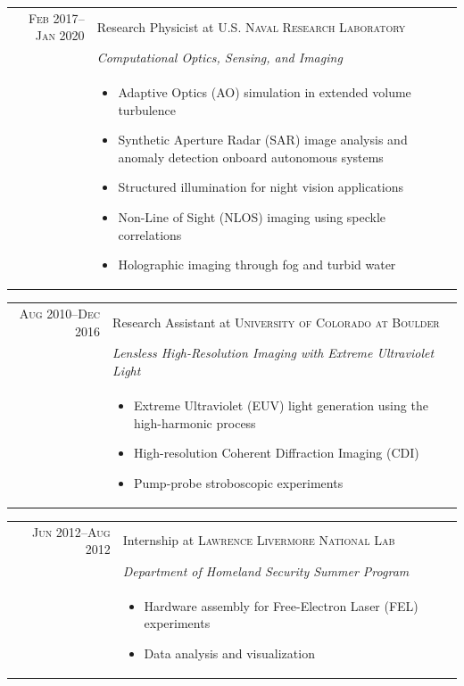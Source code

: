 \documentclass[letterpaper,12pt]{article}
\begin{document}
\begin{tabular}{rp{13cm}}
\textsc{Feb 2017}--\textsc{Jan 2020} & Research Physicist at \textsc{U.S. Naval Research Laboratory}  \\  
& \emph{Computational Optics, Sensing, and Imaging} \\   
& \footnotesize{ 
\begin{itemize}[topsep=0pt,itemsep=0pt,partopsep=0pt,parsep=0pt]
	\vspace{-0.2cm}
	\item Adaptive Optics (AO) simulation in extended volume turbulence
	\item Synthetic Aperture Radar (SAR) image analysis and anomaly detection onboard autonomous systems
	\item Structured illumination for night vision applications
	\item Non-Line of Sight (NLOS) imaging using speckle correlations
	\item Holographic imaging through fog and turbid water
\end{itemize}}\\
\end{tabular}

\begin{tabular}{rp{13cm}}
\textsc{Aug 2010}--\textsc{Dec 2016} & Research Assistant at \textsc{University of Colorado at Boulder}\\
& \emph{Lensless High-Resolution Imaging with Extreme Ultraviolet Light}\\ 
& \footnotesize{
	\begin{itemize}[topsep=0pt,itemsep=0pt,partopsep=0pt,parsep=0pt]
		\vspace{-0.2cm}
		\item Extreme Ultraviolet (EUV) light generation using the high-harmonic process
		\item High-resolution Coherent Diffraction Imaging (CDI)
		\item Pump-probe stroboscopic experiments 

\end{itemize}}\\
\end{tabular}

\begin{tabular}{rp{13cm}}
    \textsc{Jun 2012}--\textsc{Aug 2012} & Internship at \textsc{Lawrence Livermore National Lab}  \\  
    & \emph{Department of Homeland Security Summer Program} \\   
    & \footnotesize{ 
        \begin{itemize}[topsep=0pt,itemsep=0pt,partopsep=0pt,parsep=0pt]
            \vspace{-0.2cm}
            \item Hardware assembly for Free-Electron Laser (FEL) experiments
            \item Data analysis and visualization
    \end{itemize}}\\
\end{tabular}
\end{document}
